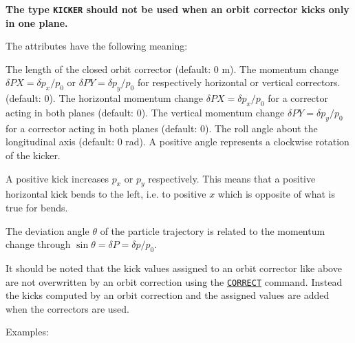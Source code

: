
\textbf{The type \texttt{KICKER} should not be used when an orbit corrector
  kicks only in one plane.}

The attributes have the following meaning: 
\begin{madlist}
    The length of the closed orbit corrector (default: 0 m). 
    The momentum change $\delta PX = \delta p_x/p_0$ or 
     $\delta PY = \delta p_y / p_0$ for respectively horizontal or vertical
     correctors. (default: 0).  
    The horizontal momentum change 
     $\delta PX = \delta p_x/p_0$ for a corrector acting in both planes
     (default: 0).  
    The vertical momentum change 
     $\delta PY = \delta p_y/p_0$  for a corrector acting in both planes
     (default: 0).  
    The roll angle about the longitudinal axis (default: 0
     rad). A positive angle represents a clockwise rotation of the
     kicker.  
\end{madlist}

A positive kick increases $p_x$ or $p_y$ respectively. This
means that a positive horizontal kick bends to the left,  i.e. to
positive $x$ which is opposite of what is true for bends.    

The deviation angle $\theta$ of the particle trajectory is related to
the momentum change through  $\sin \theta = \delta P = \delta p / p_0$.

It should be noted that the kick values assigned to an orbit corrector
like above are not overwritten by an orbit correction using the 
\hyperref[sec:correct]{\texttt{CORRECT}}
command. Instead the kicks computed by an orbit correction and the
assigned values are added when the correctors are used.  

 Examples: 

